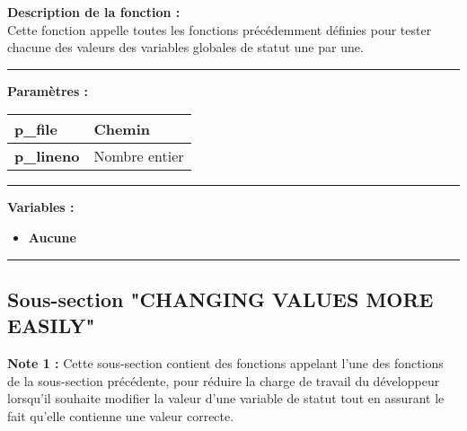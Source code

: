 \documentclass[a4paper,10pt]{article}
\begin{document}
\begin{justify}
    \textbf{Description de la fonction :}\\[1\baselineskip]
    Cette fonction appelle toutes les fonctions précédemment définies pour tester chacune des valeurs des variables globales de statut une par une.
\end{justify}


\par\noindent\rule{\textwidth}{0.4pt}

\begin{justify}
    \textbf{Paramètres :}\\[1\baselineskip]
    \begin{tabular}{|l|l|}
        \hline
        \textbf{\color{orange}p\_file} & Chemin\\
        \hline
        \textbf{\color{orange}p\_lineno} & Nombre entier\\
        \hline
    \end{tabular}
\end{justify}


\par\noindent\rule{\textwidth}{0.4pt}

\begin{justify}
    \textbf{Variables :}
    \begin{itemize}
        \item \textbf{Aucune}
    \end{itemize}
\end{justify}




\color{green}\par\noindent\rule{\textwidth}{0.4pt}\color{white}

\color{green}
\subsection{Sous-section "CHANGING VALUES MORE EASILY"}\color{white}

\begin{justify}
    \textbf{Note 1 :} Cette sous-section contient des fonctions appelant l'une des fonctions de la sous-section précédente, pour réduire la charge de travail du développeur lorsqu'il souhaite modifier la valeur d'une variable de statut tout en assurant le fait qu'elle contienne une valeur correcte.
\end{justify}
\end{document}
